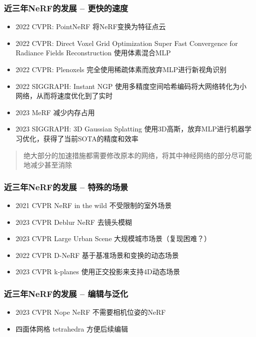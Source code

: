 \begin{frame}
    \frametitle{近三年NeRF的发展 -- 更快的速度}
    \begin{itemize}
        \item 2022 CVPR: PointNeRF\cite{xuPointNeRFPointbasedNeurala} 将NeRF变换为特征点云
        \item 2022 CVPR: Direct Voxel Grid Optimization Super Fast Convergence for Radiance  Fields Reconstruction \cite{sunDirectVoxelGrid2022} 使用体素混合MLP
        \item 2022 CVPR: Plenoxels \cite{yuPlenoxelsRadianceFields2021} 完全使用稀疏体素而放弃MLP进行新视角识别
        \item 2022 SIGGRAPH: Instant NGP \cite{mullerInstantNeuralGraphics2022} 使用多精度空间哈希编码将大网络转化为小网络，从而将速度优化到了实时
        \item 2023 MeRF\cite{reiserMERFMemoryEfficientRadiance2023} 减少内存占用
        \item 2023 SIGGRAPH: 3D Gaussian Splatting \cite{kerbl3DGaussianSplatting2023} 使用3D高斯，放弃MLP进行机器学习优化，获得了当前SOTA的精度和效率
    \end{itemize}
    \begin{quote}
        绝大部分的加速措施都需要修改原本的网络，将其中神经网络的部分尽可能地减少甚至消除
    \end{quote}
\end{frame}

\begin{frame}
    \frametitle{近三年NeRF的发展 -- 特殊的场景}
    \begin{itemize}
        \item 2021 CVPR NeRF in the wild \cite{martin-bruallaNeRFWildNeural2021} 不受限制的室外场景
        \item 2023 CVPR Deblur NeRF \cite{leeDPNeRFDeblurredNeural2023} 去镜头模糊
        \item 2023 CVPR Large Urban Scene \cite{xuGridguidedNeuralRadiance2023} 大规模城市场景（复现困难？）
        \item 2022 CVPR D-NeRF \cite{pumarolaDNeRFNeuralRadiance2021} 基于基准场景和变换的动态场景
        \item 2023 CVPR k-planes \cite{KPlanesExplicitRadiance2023} 使用正交投影来支持4D动态场景
    \end{itemize}
\end{frame}

\begin{frame}
    \frametitle{近三年NeRF的发展 -- 编辑与泛化}
    \begin{itemize}
        \item 2023 CVPR Nope NeRF \cite{bianNoPeNeRFOptimisingNeural2023} 不需要相机位姿的NeRF
        \item 四面体网格 tetrahedra\cite{kulhanekTetraNeRFRepresentingNeural2023} 方便后续编辑
    \end{itemize}
\end{frame}

